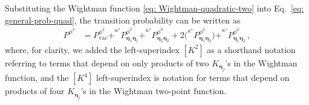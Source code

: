 \documentclass[prd,twocolumn,superscriptaddress,nofootinbib,floatfix,amsmath,amssymb]{revtex4-2}
\newcommand{\vac}{\text{vac}}
\newcommand{\bc}{{\bm{\eta}}}
\begin{document}
    Substituting the Wightman function \eqref{eq: Wightman-quadratic-two} into Eq.~\eqref{eq: general-prob-quad}, the transition probability can be written as
    \begin{align}
        P^{\phi^2} &= 
        P_{\vac}^{\phi^2} + ^{^{K^2}}\!\!\!\!P^{\phi^2}_{\bc_1\bc_1}+^{^{K^2}}\!\!\!\!P^{\phi^2}_{\bc_2\bc_2} + 2\big(\phantom{ } ^{^{K^2}}\!\!\!\!P^{\phi^2}_{\bc_1\bc_2}\big) + ^{^{K^4}}\!\!\!\!P^{\phi^2}_{\bc_1\bc_2}\,,
        \label{eq: probability-quadratic-two}
    \end{align}
    where, for clarity, we added the left-superindex $[K^2]$ as a shorthand notation referring to terms that depend on only products of two $K_{\bc_j}$'s in the Wightman function, and the $[K^4]$ left-superindex is notation for terms that depend on  products of four $K_{\bc_j}$'s in the Wightman two-point function. 
    
\end{document}
